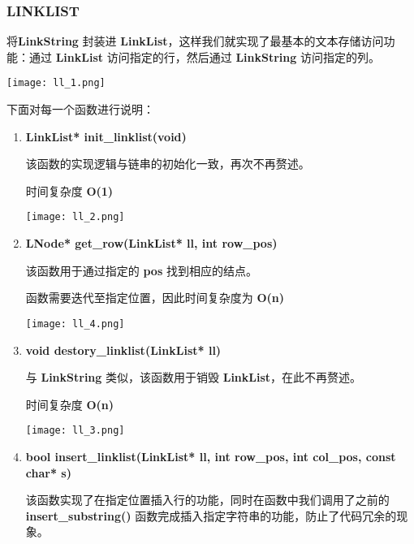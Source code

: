         \subsubsection{LINKLIST}
            \par 将\textbf{LinkString} 封装进 \textbf{LinkList}，这样我们就实现了最基本的文本存储访问功能：通过 \textbf{LinkList} 访问指定的行，然后通过 \textbf{LinkString} 访问指定的列。
            \begin{figure*}[htbp]
                \texttt{[image: ll\_1.png]}
            \end{figure*}
            \par 下面对每一个函数进行说明：
            \begin{enumerate}
                \item \textbf{LinkList* init\_linklist(void)}
                    \par 该函数的实现逻辑与链串的初始化一致，再次不再赘述。
                    \par 时间复杂度 \textbf{O(1)}
                    \begin{figure*}[htbp]
                        \texttt{[image: ll\_2.png]}
                    \end{figure*}
                \item \textbf{LNode* get\_row(LinkList* ll, int row\_pos)}
                    \par 该函数用于通过指定的 \textbf{pos} 找到相应的结点。
                    \par 函数需要迭代至指定位置，因此时间复杂度为 \textbf{O(n)}
                    \begin{figure*}[htbp]
                        \texttt{[image: ll\_4.png]}
                    \end{figure*}
                \item \textbf{void destory\_linklist(LinkList* ll)}
                    \par 与 \textbf{LinkString} 类似，该函数用于销毁 \textbf{LinkList}，在此不再赘述。
                    \par 时间复杂度 \textbf{O(n)}
                    \begin{figure*}[htbp]
                        \texttt{[image: ll\_3.png]}
                    \end{figure*}
                \item \textbf{bool insert\_linklist(LinkList* ll, int row\_pos, int col\_pos, const char* s)}
                    \par 该函数实现了在指定位置插入行的功能，同时在函数中我们调用了之前的 \textbf{insert\_substring()} 函数完成插入指定字符串的功能，防止了代码冗余的现象。

\end{enumerate}
